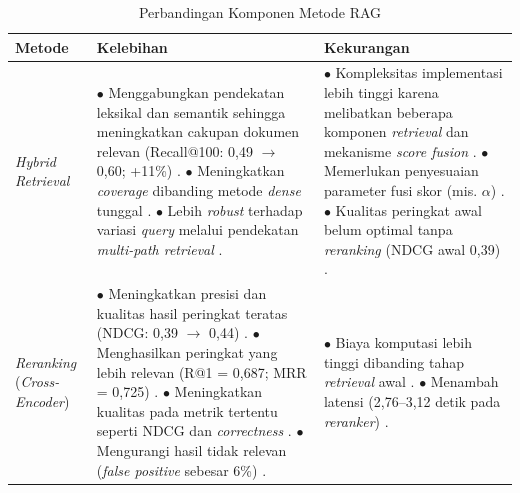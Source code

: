\begin{table}[H]
\centering
\small
\caption{Perbandingan Komponen Metode RAG \cite{rustamov2025tax,ravishankar2025hybrid,elkiran2026empirical,gupta2025compliance,liu2025audit}}
\label{tab:komparasi_metode}
\begin{tabular}{|p{2.3cm}|p{5.8cm}|p{5.8cm}|}
\hline
\textbf{Metode} & \textbf{Kelebihan} & \textbf{Kekurangan} \\
\hline
\textit{Hybrid Retrieval} &
$\bullet$ Menggabungkan pendekatan leksikal dan semantik sehingga meningkatkan cakupan dokumen relevan (Recall@100: 0,49 $\rightarrow$ 0,60; +11\%) \cite{rustamov2025tax}. \newline
$\bullet$ Meningkatkan \textit{coverage} dibanding metode \textit{dense} tunggal \cite{liu2025audit}. \newline
$\bullet$ Lebih \textit{robust} terhadap variasi \textit{query} melalui pendekatan \textit{multi-path retrieval} \cite{liu2025audit}. \newline
&
$\bullet$ Kompleksitas implementasi lebih tinggi karena melibatkan beberapa komponen \textit{retrieval} dan mekanisme \textit{score fusion} \cite{ravishankar2025hybrid,elkiran2026empirical}. \newline
$\bullet$ Memerlukan penyesuaian parameter fusi skor (mis. $\alpha$) \cite{ravishankar2025hybrid}. \newline
$\bullet$ Kualitas peringkat awal belum optimal tanpa \textit{reranking} (NDCG awal 0,39) \cite{rustamov2025tax}. \newline
\\
\hline
\textit{Reranking} (\textit{Cross-Encoder}) &
$\bullet$ Meningkatkan presisi dan kualitas hasil peringkat teratas (NDCG: 0,39 $\rightarrow$ 0,44) \cite{rustamov2025tax}. \newline
$\bullet$ Menghasilkan peringkat yang lebih relevan (R@1 = 0,687; MRR = 0,725) \cite{elkiran2026empirical}. \newline
$\bullet$ Meningkatkan kualitas pada metrik tertentu seperti NDCG dan \textit{correctness} \cite{rustamov2025tax,elkiran2026empirical}. \newline
$\bullet$ Mengurangi hasil tidak relevan (\textit{false positive} sebesar 6\%) \cite{gupta2025compliance}. \newline
&
$\bullet$ Biaya komputasi lebih tinggi dibanding tahap \textit{retrieval} awal \cite{gupta2025compliance,elkiran2026empirical}. \newline
$\bullet$ Menambah latensi (2,76--3,12 detik pada \textit{reranker}) \cite{elkiran2026empirical}. \newline

\end{tabular}
\end{table}
